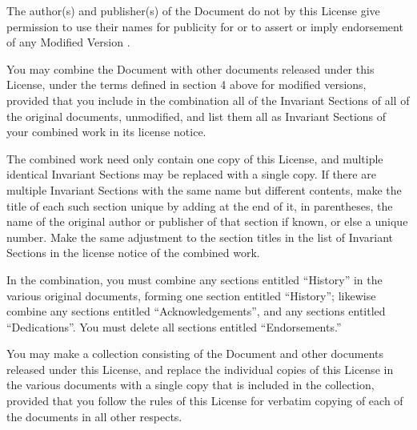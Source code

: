     
    

      The author(s) and publisher(s) of the Document do not by this License
      give permission to use their names for publicity for or to
      assert or imply endorsement of any Modified Version .
    

    
    


    

      You may combine the Document
      with other documents released under this License, under the
      terms defined in section 4
      above for modified versions, provided that you include in the
      combination all of the Invariant
      Sections of all of the original documents, unmodified,
      and list them all as Invariant Sections of your combined work in
      its license notice.
    

    
    

      The combined work need only contain one copy of this License,
      and multiple identical Invariant
      Sections may be replaced with a single copy. If there are
      multiple Invariant Sections with the same name but different
      contents, make the title of each such section unique by adding
      at the end of it, in parentheses, the name of the original
      author or publisher of that section if known, or else a unique
      number. Make the same adjustment to the section titles in the
      list of Invariant Sections in the license notice of the combined
      work.
    

    
    

      In the combination, you must combine any sections entitled
      ``History'' in the various original documents,
      forming one section entitled ``History''; likewise
      combine any sections entitled ``Acknowledgements'',
      and any sections entitled ``Dedications''.  You must
      delete all sections entitled ``Endorsements.''
    

    
    


    

      You may make a collection consisting of the Document and other documents
      released under this License, and replace the individual copies
      of this License in the various documents with a single copy that
      is included in the collection, provided that you follow the
      rules of this License for verbatim copying of each of the
      documents in all other respects.
    

